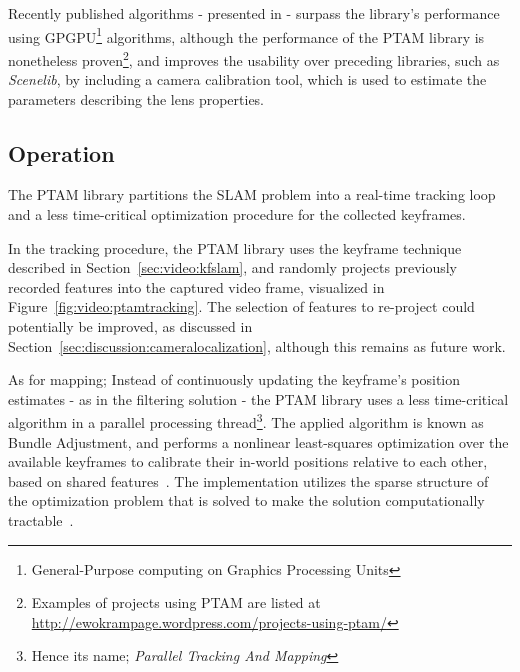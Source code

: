        Recently published algorithms - presented in \citep{Newcombe2011} - surpass
        the library's performance using GPGPU\footnote{General-Purpose computing on Graphics Processing Units}
        algorithms, although the performance of the PTAM library is nonetheless proven\footnote{Examples of projects using PTAM are listed at \url{http://ewokrampage.wordpress.com/projects-using-ptam/}},
        and improves the usability over preceding libraries, such as \textit{Scenelib}, by including
        a camera calibration tool, which is used to estimate the parameters describing the lens properties.

        \subsection{Operation}
            The PTAM library partitions the SLAM problem into a real-time tracking
            loop and a less time-critical optimization procedure for the collected keyframes.

            In the tracking procedure, the PTAM library uses the keyframe
            technique described in Section~\ref{sec:video:kfslam}, and randomly projects
            previously recorded features into the captured video frame,
            visualized in Figure~\ref{fig:video:ptamtracking}.
            The selection of features to re-project could potentially be
            improved, as discussed in Section~\ref{sec:discussion:cameralocalization},
            although this remains as future work.

            As for mapping; Instead of continuously updating the keyframe's position estimates - as in the filtering solution -
            the PTAM library uses a less time-critical algorithm in a parallel processing thread\footnote{Hence its name; \textit{Parallel Tracking And Mapping}}.
            The applied algorithm is known as Bundle Adjustment, and
            performs a nonlinear least-squares optimization over the available keyframes
            to calibrate their in-world positions relative to each other, based on shared features~\citep{lour09}.
            The implementation utilizes the sparse structure of the optimization problem that
            is solved to make the solution computationally tractable~\citep{Lourakis11bundle}.

